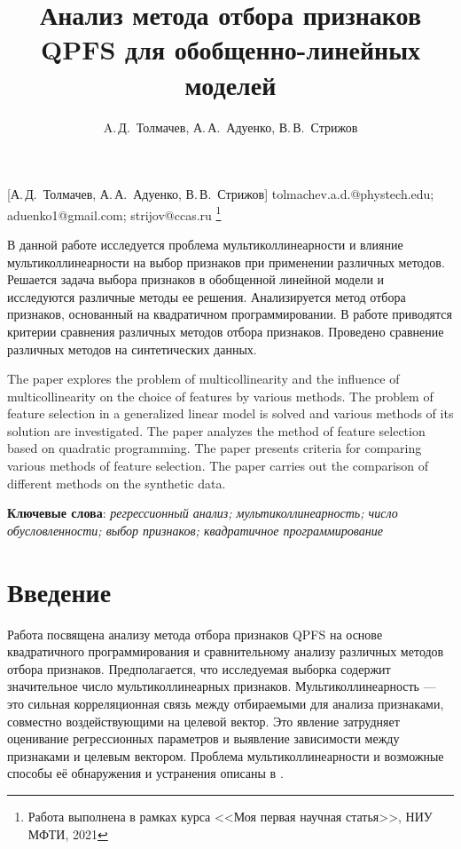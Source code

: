 \documentclass[12pt, twoside]{article}
\begin{document}
\title
    [Анализ метода отбора признаков QPFS для обобщенно-линейных моделей] %
    {Анализ метода отбора признаков QPFS для обобщенно-линейных моделей}
\author
    [A.\,Д.~Толмачев] %
    {A.\,Д.~Толмачев, А.\,А.~Адуенко, В.\,В.~Стрижов} %
    [А.\,Д.~Толмачев, А.\,А.~Адуенко, В.\,В.~Стрижов] %
\email
    {tolmachev.a.d.@phystech.edu; aduenko1@gmail.com; strijov@ccas.ru}
\thanks
    {Работа выполнена в рамках курса <<Моя первая научная статья>>, НИУ МФТИ, 2021}
    
\abstract
    {В данной работе исследуется проблема мультиколлинеарности и влияние мультиколлинеарности на выбор признаков при применении различных методов. Решается задача выбора признаков в обобщенной линейной модели и исследуются различные методы ее решения. Анализируется метод отбора признаков, основанный на квадратичном программировании. В работе приводятся критерии сравнения различных методов отбора признаков. Проведено сравнение различных методов на синтетических данных.
    
\bigskip
    The paper explores the problem of multicollinearity and the influence of multicollinearity on the choice of features by various methods. The problem of feature selection in a generalized linear model is solved and various methods of its solution are investigated. The paper analyzes the method of feature selection based on quadratic programming. The paper presents criteria for comparing various methods of feature selection. The paper carries out the comparison of different methods on the synthetic data.

\bigskip
\noindent
\textbf{Ключевые слова}: \emph {регрессионный анализ; мультиколлинеарность; число обусловленности; выбор признаков;  квадратичное программирование}
}





\maketitle
\linenumbers

\section{Введение}
Работа посвящена анализу метода отбора признаков QPFS на основе квадратичного программирования и сравнительному анализу различных методов отбора признаков. Предполагается, что исследуемая выборка содержит значительное число мультиколлинеарных признаков. Мультиколлинеарность — это сильная корреляционная связь между отбираемыми для анализа признаками, совместно
воздействующими на целевой вектор. Это явление затрудняет оценивание регрессионных параметров и выявление зависимости между признаками и целевым вектором. Проблема мультиколлинеарности и возможные способы её обнаружения и устранения описаны в \cite{SneeRon, Leamer, Askin}. 
\end{document}
